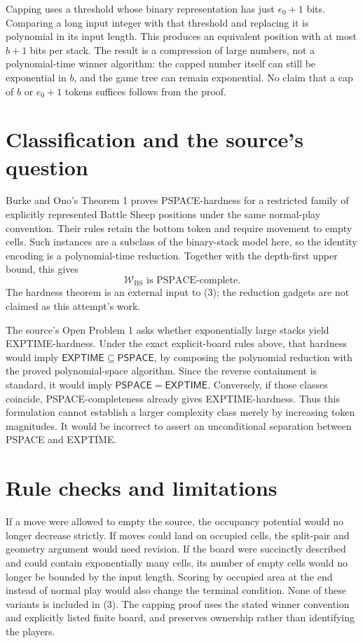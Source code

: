\documentclass[11pt]{article}
\begin{document}
Capping uses a threshold whose binary representation has just $e_0+1$
bits. Comparing a long input integer with that threshold and replacing it
is polynomial in its input length. This produces an equivalent position
with at most $b+1$ bits per stack. The result is a compression of large
numbers, not a polynomial-time winner algorithm: the capped number itself
can still be exponential in $b$, and the game tree can remain exponential.
No claim that a cap of $b$ or $e_0+1$ tokens suffices follows from the proof.

\section*{Classification and the source's question}
Burke and Ono's Theorem 1 proves PSPACE-hardness for a restricted family
of explicitly represented Battle Sheep positions under the same
normal-play convention. Their rules retain the bottom token and require
movement to empty cells. Such instances are a subclass of the binary-stack
model here, so the identity encoding is a polynomial-time reduction.
Together with the depth-first upper bound, this gives
\[
                         \mathcal W_{\mathrm{BS}}
                         \text{ is PSPACE-complete}.             \tag{3}
\]
The hardness theorem is an external input to (3); the reduction gadgets
are not claimed as this attempt's work.

The source's Open Problem 1 asks whether exponentially large stacks yield
EXPTIME-hardness. Under the exact explicit-board rules above, that
hardness would imply $\mathsf{EXPTIME}\subseteq\mathsf{PSPACE}$, by
composing the polynomial reduction with the proved polynomial-space
algorithm. Since the reverse containment is standard, it would imply
$\mathsf{PSPACE}=\mathsf{EXPTIME}$. Conversely, if those classes coincide,
PSPACE-completeness already gives EXPTIME-hardness. Thus this formulation
cannot establish a larger complexity class merely by increasing token
magnitudes. It would be incorrect to assert an unconditional separation
between PSPACE and EXPTIME.

\section*{Rule checks and limitations}
If a move were allowed to empty the source, the occupancy potential would
no longer decrease strictly. If moves could land on occupied cells, the
split-pair and geometry argument would need revision. If the board were
succinctly described and could contain exponentially many cells, its
number of empty cells would no longer be bounded by the input length.
Scoring by occupied area at the end instead of normal play would also
change the terminal condition. None of these variants is included in (3).
The capping proof uses the stated winner convention and explicitly listed
finite board, and preserves ownership rather than identifying the players.
\end{document}
